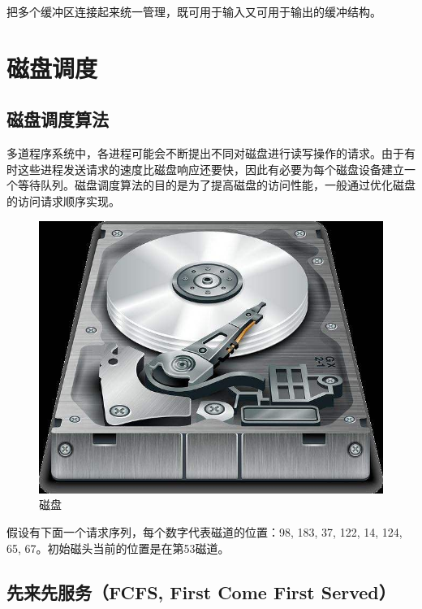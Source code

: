 把多个缓冲区连接起来统一管理，既可用于输入又可用于输出的缓冲结构。

\newpage

\section{磁盘调度}

\subsection{磁盘调度算法}

多道程序系统中，各进程可能会不断提出不同对磁盘进行读写操作的请求。由于有时这些进程发送请求的速度比磁盘响应还要快，因此有必要为每个磁盘设备建立一个等待队列。磁盘调度算法的目的是为了提高磁盘的访问性能，一般通过优化磁盘的访问请求顺序实现。

\begin{figure}[H]
	\centering
	\includegraphics[scale=0.5]{img/Chapter4/4-4/1.png}
	\caption{磁盘}
\end{figure}

假设有下面一个请求序列，每个数字代表磁道的位置：98, 183, 37, 122, 14, 124, 65, 67。初始磁头当前的位置是在第53磁道。\\

\subsection{先来先服务（FCFS, First Come First Served）}

